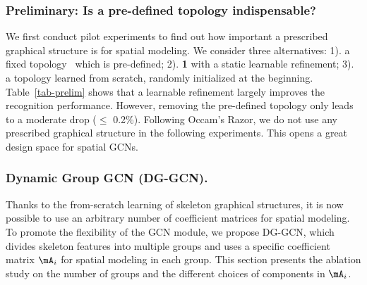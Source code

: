 \begin{wraptable}{r}{.47\linewidth}
    \captionsetup{font=small, position=top}
	\centering 
    \vspace{-8mm}
    \caption{The topology learned from scratch works well.}
    \vspace{-5mm}
    \label{tab-prelim}
    \vspace{-9mm}
\end{wraptable} 

\vspace{-3mm}
\subsubsection{Preliminary: Is a pre-defined topology indispensable? }
We first conduct pilot experiments to find out how important a prescribed graphical structure is for spatial modeling. 
We consider three alternatives: 1). a fixed topology~\cite{shi2019two} which is pre-defined; 2). \textbf{1} with a static learnable refinement; 
3). a topology learned from scratch, randomly initialized at the beginning.
Table~\ref{tab-prelim} shows that a learnable refinement largely improves the recognition performance. 
However, removing the pre-defined topology only leads to a moderate drop ($\le$ 0.2\%). 
Following Occam's Razor, we do not use any prescribed graphical structure in the following experiments.
This opens a great design space for spatial GCNs.

\vspace{-3mm}
\subsubsection{Dynamic Group GCN (DG-GCN). } 
Thanks to the from-scratch learning of skeleton graphical structures, it is now possible to use an arbitrary number of coefficient matrices for spatial modeling. 
To promote the flexibility of the GCN module, we propose DG-GCN, which divides skeleton features into multiple groups and uses a specific coefficient matrix $\mA_i$ for spatial modeling in each group. 
This section presents the ablation study on the number of groups and the different choices of components in $\mA_i$.  

